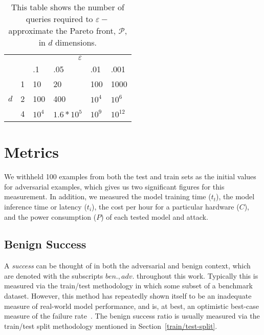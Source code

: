 \documentclass[conference]{IEEEtran}
\begin{document}
% 
\begin{table}[t!]
\begin{tabular}{cl|llll|}
\cline{3-6}
                                           &   & \multicolumn{4}{c|}{$\varepsilon$}            \\ \cline{3-6} 
                                           &   & .1     & .05          & .01    & .001      \\ \hline
\multicolumn{1}{|c|}{\multirow{3}{*}{$d$}} & 1 & 10     & 20           & 100    & 1000      \\
\multicolumn{1}{|c|}{}                     & 2 & 100    & 400          & $10^4$ & $10^6$    \\
\multicolumn{1}{|c|}{}                     & 4 & $10^4$ & $1.6 * 10^5$ & $10^9$ & $10^{12}$ \\ \hline
\end{tabular}
\caption{This table shows the number of queries required to $\varepsilon-$ approximate the Pareto front, $\mathcal{P}$, in $d$ dimensions.}
\label{tab:pareto}
\end{table}

\section{Metrics}

We withheld 100 examples from both the test and train sets as the initial values for adversarial examples, which gives us two significant figures for this measurement. In addition, we measured the model training time ($t_{t}$), the model inference time or latency ($t_{i}$), the cost per hour for a particular hardware ($C$), and the power consumption ($P$) of each tested model and attack.

\subsection{Benign Success}
A \textit{success} can be thought of in both the adversarial and benign context, which are denoted with the subscripts $ben.,adv.$ throughout this work. Typically this is measured via the train/test methodology in which some subset of a benchmark dataset. However, this method has repeatedly shown itself to be an inadequate measure of real-world model performance, and is, at best, an optimistic best-case measure of the failure rate~\cite{croce_reliable_2020}. The benign success ratio is usually measured via the train/test split methodology mentioned in Section~\ref{train/test-split}. 
\end{document}
